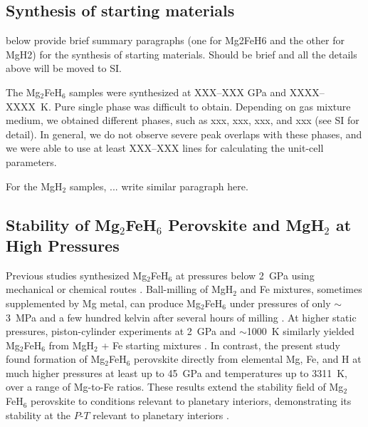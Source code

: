 \documentclass[draft,jgrga,12pt]{agujournal2019}
\begin{document}
\subsection{Synthesis of starting materials}

\begin{cbox}
    below provide brief summary paragraphs (one for Mg2FeH6 and the other for MgH2) for the synthesis of starting materials.  Should be brief and all the details above will be moved to SI.
\end{cbox}

The Mg$_2$FeH$_6$ samples were synthesized at XXX--XXX GPa and XXXX--XXXX~K\@.
Pure single phase was difficult to obtain.
Depending on gas mixture medium, we obtained different phases, such as xxx, xxx, xxx, and xxx (see SI for detail).
In general, we do not observe severe peak overlaps with these phases, and we were able to use at least XXX--XXX lines for calculating the unit-cell parameters.

For the MgH$_2$ samples, ... write similar paragraph here.

\subsection{Stability of Mg$_2$FeH$_6$ Perovskite and MgH$_2$ at High Pressures}

Previous studies synthesized Mg$_2$FeH$_6$ at pressures below 2~{GPa} using mechanical or chemical routes \cite{george_bulk_2009,polanski_mg2feh6_2019, lang_insitu_2017,retuerto_highpressure_2010, retuerto_neutron_2015}.
Ball-milling of MgH$_2$ and Fe mixtures, sometimes supplemented by Mg metal, can produce Mg$_2$FeH$_6$ under pressures of only $\sim$3~{MPa} and a few hundred kelvin after several hours of milling \cite{george_bulk_2009,polanski_mg2feh6_2019, lang_insitu_2017}.
At higher static pressures, piston-cylinder experiments at 2~GPa and $\sim$1000~K similarly yielded Mg$_2$FeH$_6$ from MgH$_2$ + Fe starting mixtures \cite{retuerto_highpressure_2010, retuerto_neutron_2015}.
In contrast, the present study found formation of Mg$_2$FeH$_6$ perovskite directly from elemental Mg, Fe, and H at much higher pressures at least up to 45~{GPa} and temperatures up to 3311~K, over a range of Mg-to-Fe ratios. 
These results extend the stability field of Mg$_2$FeH$_6$ perovskite to conditions relevant to planetary interiors, demonstrating its stability at the $P$-$T$ relevant to planetary interiors \cite{asselli_formation_2013,puszkiel_new_2018}.
\end{document}
